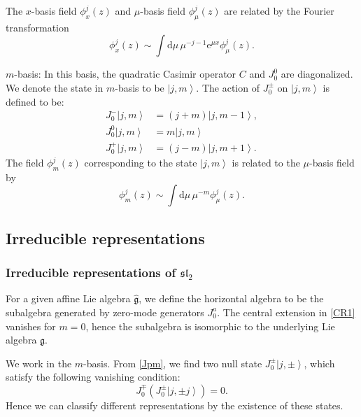 \documentclass[10pt,a4paper]{article}
\numberwithin{equation}{section}
\newcommand{\ket}[1]{\left| #1 \right\rangle}
\begin{document}
The $x$-basis field $\phi^{j}_{x}(z)$ and $\mu$-basis field $\phi^{j}_{\mu}(z)$ are related by the Fourier transformation 
\begin{equation}
    \phi^{j}_{x}(z) \sim \int \mathrm{d} \mu \, \mu^{-j-1} \mathrm{e}^{\mu x} \phi^{j}_{\mu}(z).
\end{equation}

$m$-basis: In this basis, the quadratic Casimir operator $C$ and $J^{0}_{0}$ are diagonalized. We denote the 
state in $m$-basis to be $\ket{j,m}$. The action of 
$J^{\pm}_{0}$ on $\ket{j,m}$ is defined to be:
\begin{equation}
    \begin{aligned}
        J^{-}_{0} \ket{j,m} &= (j+m)\ket{j,m-1}, \\
        J^{0}_{0} \ket{j,m} &= m \ket{j,m} \\
        J^{+}_{0} \ket{j,m} &= (j-m)\ket{j,m+1}. \label{Jpm}
    \end{aligned}
\end{equation}
The field $\phi^{j}_{m}(z)$ corresponding to the state $\ket{j,m}$ is related to the $\mu$-basis field by 
\begin{equation}
    \phi^{j}_{m}(z) \sim \int \mathrm{d} \mu \, \mu^{-m} \phi^{j}_{\mu}(z).
\end{equation}


\subsection{Irreducible representations}
\subsubsection*{Irreducible representations of \texorpdfstring{$\mathfrak{sl}_{2}$}{Lg}}
For a given affine Lie algebra $\widehat{\mathfrak{g}}$, we define the horizontal algebra to be the subalgebra generated by zero-mode 
generators $J^{a}_{0}$. The central extension in \eqref{CR1} vanishes for $m = 0$, hence the subalgebra is isomorphic to the underlying 
Lie algebra $\mathfrak{g}$.

We work in the $m$-basis. From \eqref{Jpm}, we find two null state $J^{\pm}_{0}\ket{j,\pm}$, which satisfy the following vanishing 
condition:
\begin{equation}
    J^{\mp}_{0}\left(J^{\pm}_{0} \ket{j,\pm j}\right) = 0.
\end{equation}
Hence we can classify different representations by the existence of these states.
\end{document}
